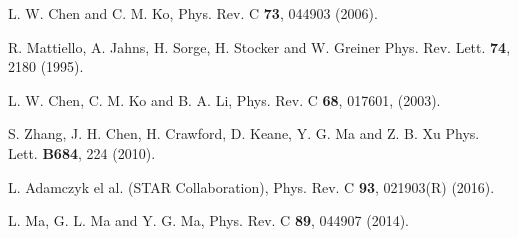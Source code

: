 \documentclass[twocolumn,aps,prc,showpacs,superscriptaddress,preprintnumbers,floatfix,nofootinbib]{revtex4}
\begin{document}
\begin{CJK*}{GBK}{song}
\begin{thebibliography}{88}
 L. W. Chen and C. M. Ko, Phys. Rev. C
  \textbf{73}, 044903 (2006).

 R. Mattiello, A. Jahns, H. Sorge, H. Stocker and W. Greiner
  Phys. Rev. Lett. \textbf{74}, 2180 (1995).

 L. W. Chen, C. M. Ko and B. A. Li, Phys. Rev. C
  \textbf{68}, 017601, (2003).

 S. Zhang, J. H. Chen, H. Crawford, D. Keane, Y. G. Ma and Z. B. Xu
  Phys. Lett. \textbf{B684}, 224 (2010).

 L. Adamczyk el al. (STAR Collaboration), Phys. Rev. C
  \textbf{93}, 021903(R) (2016).

 L. Ma, G. L. Ma and Y. G. Ma, Phys. Rev. C
  \textbf{89}, 044907 (2014).
\end{thebibliography}
\end{CJK*}
\end{document}
